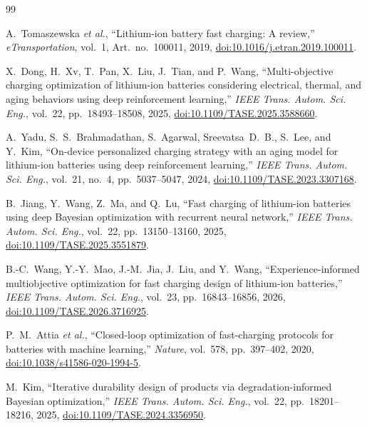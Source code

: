 \documentclass[lettersize,journal]{IEEEtran}
\begin{document}
\begin{thebibliography}{99}

A.~Tomaszewska \textit{et al.},
``Lithium-ion battery fast charging: A review,''
\textit{eTransportation}, vol.~1, Art.~no.~100011, 2019,
\href{https://doi.org/10.1016/j.etran.2019.100011}
{doi:10.1016/j.etran.2019.100011}.

X.~Dong, H.~Xv, T.~Pan, X.~Liu, J.~Tian, and P.~Wang,
``Multi-objective charging optimization of lithium-ion batteries
considering electrical, thermal, and aging behaviors using deep
reinforcement learning,''
\textit{IEEE Trans. Autom. Sci. Eng.}, vol.~22, pp.~18493--18508, 2025,
\href{https://doi.org/10.1109/TASE.2025.3588660}
{doi:10.1109/TASE.2025.3588660}.

A.~Yadu, S.~S.~Brahmadathan, S.~Agarwal, Sreevatsa~D.~B., S.~Lee, and Y.~Kim,
``On-device personalized charging strategy with an aging model for
lithium-ion batteries using deep reinforcement learning,''
\textit{IEEE Trans. Autom. Sci. Eng.}, vol.~21, no.~4, pp.~5037--5047, 2024,
\href{https://doi.org/10.1109/TASE.2023.3307168}
{doi:10.1109/TASE.2023.3307168}.

B.~Jiang, Y.~Wang, Z.~Ma, and Q.~Lu,
``Fast charging of lithium-ion batteries using deep Bayesian optimization
with recurrent neural network,''
\textit{IEEE Trans. Autom. Sci. Eng.}, vol.~22, pp.~13150--13160, 2025,
\href{https://doi.org/10.1109/TASE.2025.3551879}
{doi:10.1109/TASE.2025.3551879}.

B.-C.~Wang, Y.-Y.~Mao, J.-M.~Jia, J.~Liu, and Y.~Wang,
``Experience-informed multiobjective optimization for fast
charging design of lithium-ion batteries,''
\textit{IEEE Trans. Autom. Sci. Eng.},
vol.~23, pp.~16843--16856, 2026,
\href{https://doi.org/10.1109/TASE.2026.3716925}
{doi:10.1109/TASE.2026.3716925}.

P.~M.~Attia \textit{et al.},
``Closed-loop optimization of fast-charging protocols for batteries
with machine learning,''
\textit{Nature}, vol.~578, pp.~397--402, 2020,
\href{https://doi.org/10.1038/s41586-020-1994-5}
{doi:10.1038/s41586-020-1994-5}.

M.~Kim,
``Iterative durability design of products via degradation-informed
Bayesian optimization,''
\textit{IEEE Trans. Autom. Sci. Eng.}, vol.~22, pp.~18201--18216, 2025,
\href{https://doi.org/10.1109/TASE.2024.3356950}
{doi:10.1109/TASE.2024.3356950}.


\end{thebibliography}
\end{document}
